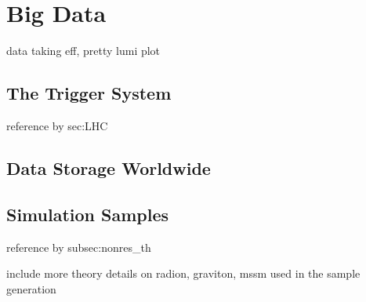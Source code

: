 \chapter{Big Data\label{ch:data}}

data taking eff, pretty lumi plot

\section{The Trigger System\label{sec:trigger}}
reference by sec:LHC

\section{Data Storage Worldwide\label{sec:storage}}


\section{Simulation Samples\label{sec:sim}}

reference by subsec:nonres\_th

include more theory details on radion, graviton, mssm used in the sample generation

